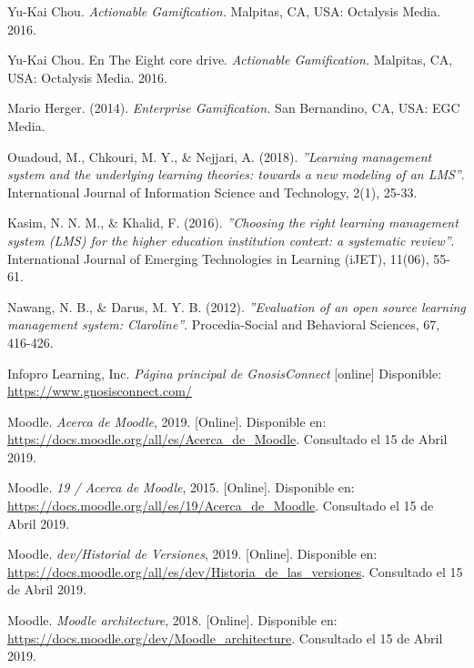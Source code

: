 \begin{thebibliography}{9}
        Yu-Kai Chou.
        \textit{Actionable Gamification.}
        Malpitas, CA, USA: Octalysis Media. 2016. 
    
    
        Yu-Kai Chou.
        En The Eight core drive.
        \textit{Actionable Gamification.}
        Malpitas, CA, USA: Octalysis Media. 2016. 
    
        Mario Herger. (2014). 
        \textit{Enterprise Gamification.} 
        San Bernandino, CA, USA: EGC Media.
    
        
        Ouadoud, M., Chkouri, M. Y., \& Nejjari, A. (2018). {\it''Learning management system and the underlying learning theories: towards a new modeling of an LMS''}. International Journal of Information Science and Technology, 2(1), 25-33.
        
        Kasim, N. N. M., \& Khalid, F. (2016). {\it''Choosing the right learning management system (LMS) for the higher education institution context: a systematic review''}. International Journal of Emerging Technologies in Learning (iJET), 11(06), 55-61.
    
        Nawang, N. B., \& Darus, M. Y. B. (2012). {\it''Evaluation of an open source learning management system: Claroline''}. Procedia-Social and Behavioral Sciences, 67, 416-426.

    Infopro Learning, Inc. \textit{Página principal de GnosisConnect} [online] Disponible:
    \url{https://www.gnosisconnect.com/}
    
    
        Moodle. {\it Acerca de Moodle}, 2019. [Online]. Disponible en: \url{https://docs.moodle.org/all/es/Acerca_de_Moodle}. Consultado el 15 de Abril 2019.
    
        Moodle. {\it 19 / Acerca de Moodle}, 2015. [Online]. Disponible en: \url{https://docs.moodle.org/all/es/19/Acerca_de_Moodle}. Consultado el 15 de Abril 2019.
    
        Moodle. {\it dev/Historial de Versiones}, 2019. [Online]. Disponible en: \url{https://docs.moodle.org/all/es/dev/Historia_de_las_versiones}. Consultado el 15 de Abril 2019.

        Moodle. {\it Moodle architecture}, 2018. [Online]. Disponible en: \url{https://docs.moodle.org/dev/Moodle_architecture}. Consultado el 15 de Abril 2019.
    

\end{thebibliography}
